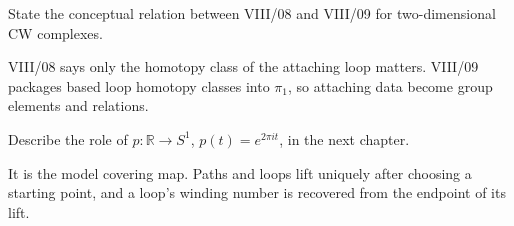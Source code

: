 \begin{problem}\label{prob:viii09-23}
State the conceptual relation between VIII/08 and VIII/09 for two-dimensional CW complexes.
\end{problem}
\begin{solution}
VIII/08 says only the homotopy class of the attaching loop matters.  VIII/09 packages based loop homotopy classes into \(\pi_1\), so attaching data become group elements and relations.
\end{solution}

\begin{problem}[Bridge]\label{prob:viii09-24}
Describe the role of \(p:\mathbb R\to S^1\), \(p(t)=e^{2\pi it}\), in the next chapter.
\end{problem}
\begin{solution}
It is the model covering map.  Paths and loops lift uniquely after choosing a starting point, and a loop's winding number is recovered from the endpoint of its lift.
\end{solution}
